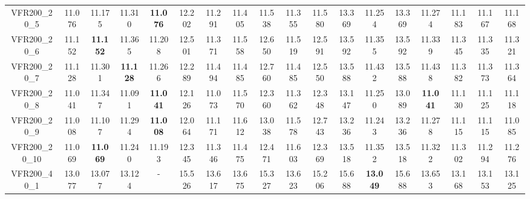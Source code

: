 \begin{tabular}{cc|ccc|ccccccccccccc}
VFR200\_20\_5      & 11.076           & 11.175           & 11.310           & {\bf 11.076}     & 12.202           & 11.291           & 11.405           & 11.538           & 11.355           & 11.580           & 13.369           & 11.254           & 13.369           & 11.274           & 11.183           & 11.167           & 11.168          \\ 
VFR200\_20\_6      & 11.152           & {\bf 11.152}     & 11.365           & 11.208           & 12.501           & 11.371           & 11.558           & 12.650           & 11.519           & 12.591           & 13.592           & 11.355           & 13.592           & 11.339           & 11.345           & 11.335           & 11.321          \\ 
VFR200\_20\_7      & 11.128           & 11.301           & {\bf 11.128}     & 11.266           & 12.289           & 11.494           & 11.485           & 12.760           & 11.485           & 12.550           & 13.588           & 11.432           & 13.588           & 11.438           & 11.382           & 11.373           & 11.364          \\ 
VFR200\_20\_8      & 11.041           & 11.347           & 11.091           & {\bf 11.041}     & 12.126           & 11.073           & 11.570           & 12.360           & 11.362           & 12.348           & 13.147           & 11.250           & 13.089           & {\bf 11.041}     & 11.130           & 11.125           & 11.118          \\ 
VFR200\_20\_9      & 11.008           & 11.107           & 11.294           & {\bf 11.008}     & 12.064           & 11.171           & 11.612           & 13.038           & 11.578           & 12.743           & 13.236           & 11.243           & 13.236           & 11.278           & 11.115           & 11.115           & 11.085          \\ 
VFR200\_20\_10     & 11.069           & {\bf 11.069}     & 11.240           & 11.193           & 12.345           & 11.346           & 11.475           & 12.471           & 11.603           & 12.369           & 13.518           & 11.352           & 13.518           & 11.322           & 11.302           & 11.294           & 11.276          \\ 
VFR200\_40\_1      & 13.077           & 13.077           & 13.124           & -                & 15.526           & 13.617           & 13.675           & 15.327           & 13.623           & 15.206           & 15.688           & {\bf 13.049}     & 15.688           & 13.653           & 13.168           & 13.153           & 13.125          \\ 

\end{tabular}

